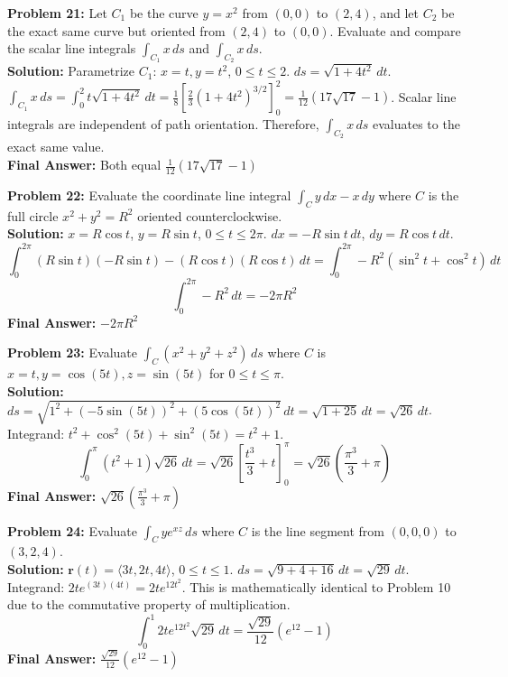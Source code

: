 \documentclass[11pt]{article}
\begin{document}
\textbf{Problem 21:} Let $C_1$ be the curve $y = x^2$ from $(0,0)$ to $(2,4)$, and let $C_2$ be the exact same curve but oriented from $(2,4)$ to $(0,0)$. Evaluate and compare the scalar line integrals $\int_{C_1} x \,ds$ and $\int_{C_2} x \,ds$.
\\
\textbf{Solution:} Parametrize $C_1$: $x=t, y=t^2$, $0 \le t \le 2$. $ds = \sqrt{1+4t^2} \,dt$.
$\int_{C_1} x \,ds = \int_0^2 t\sqrt{1+4t^2} \,dt = \frac{1}{8}\left[ \frac{2}{3}(1+4t^2)^{3/2} \right]_0^2 = \frac{1}{12}(17\sqrt{17} - 1)$.
Scalar line integrals are independent of path orientation. Therefore, $\int_{C_2} x \,ds$ evaluates to the exact same value. 
\\
\textbf{Final Answer:} Both equal $\frac{1}{12}(17\sqrt{17} - 1)$
\vspace{0.5cm}

\textbf{Problem 22:} Evaluate the coordinate line integral $\int_C y \,dx - x \,dy$ where $C$ is the full circle $x^2 + y^2 = R^2$ oriented counterclockwise.
\\
\textbf{Solution:} $x = R\cos t$, $y = R\sin t$, $0 \le t \le 2\pi$.
$dx = -R\sin t \,dt$, $dy = R\cos t \,dt$.
$$ \int_0^{2\pi} (R\sin t)(-R\sin t) - (R\cos t)(R\cos t) \,dt = \int_0^{2\pi} -R^2(\sin^2 t + \cos^2 t) \,dt $$
$$ \int_0^{2\pi} -R^2 \,dt = -2\pi R^2 $$
\textbf{Final Answer:} $-2\pi R^2$
\vspace{0.5cm}

\textbf{Problem 23:} Evaluate $\int_C (x^2 + y^2 + z^2) \,ds$ where $C$ is $x = t, y = \cos(5t), z = \sin(5t)$ for $0 \le t \le \pi$.
\\
\textbf{Solution:} $ds = \sqrt{1^2 + (-5\sin(5t))^2 + (5\cos(5t))^2} \,dt = \sqrt{1 + 25} \,dt = \sqrt{26} \,dt$.
Integrand: $t^2 + \cos^2(5t) + \sin^2(5t) = t^2 + 1$.
$$ \int_0^\pi (t^2 + 1)\sqrt{26} \,dt = \sqrt{26} \left[ \frac{t^3}{3} + t \right]_0^\pi = \sqrt{26}\left(\frac{\pi^3}{3} + \pi\right) $$
\textbf{Final Answer:} $\sqrt{26}\left(\frac{\pi^3}{3} + \pi\right)$
\vspace{0.5cm}

\textbf{Problem 24:} Evaluate $\int_C ye^{xz} \,ds$ where $C$ is the line segment from $(0,0,0)$ to $(3,2,4)$. 
\\
\textbf{Solution:} $\mathbf{r}(t) = \langle 3t, 2t, 4t \rangle$, $0 \le t \le 1$.
$ds = \sqrt{9 + 4 + 16} \,dt = \sqrt{29} \,dt$.
Integrand: $2t e^{(3t)(4t)} = 2te^{12t^2}$.
This is mathematically identical to Problem 10 due to the commutative property of multiplication.
$$ \int_0^1 2t e^{12t^2} \sqrt{29} \,dt = \frac{\sqrt{29}}{12}(e^{12} - 1) $$
\textbf{Final Answer:} $\frac{\sqrt{29}}{12}(e^{12} - 1)$
\vspace{0.5cm}
\end{document}
